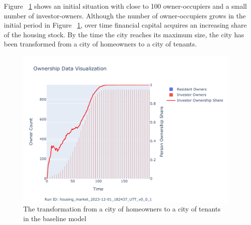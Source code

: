  Figure ~\ref{fig:Baseline_ownership_trajectory} shows an initial situation with close to 100 owner-occupiers and a small number of investor-owners. Although the number of owner-occupiers grows in the initial period in Figure ~\ref{fig:Baseline_ownership_trajectory}, over time financial capital acquires an increasing share of the housing stock. By the time the city reaches its maximum size, the city has been transformed from a city of homeowners to a city of tenants.



\begin{figure}
    \centering
    \hspace{4cm} %
    \includegraphics[scale=0.8, trim={0 1cm 0 1.8cm}, clip]{fig/Analysis/Ownership_Data_1.pdf}
    \caption{The transformation from a city of homeowners to a city of tenants in the baseline model}
    \label{fig:Baseline_ownership_trajectory}
\end{figure}









